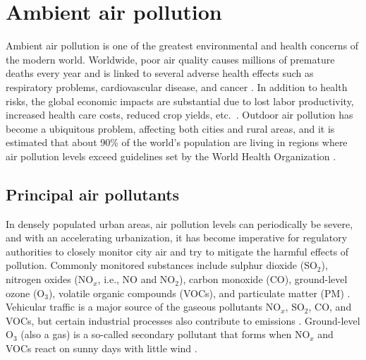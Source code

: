 \section{Ambient air pollution}

Ambient air pollution is one of the greatest environmental and health concerns of the modern world. Worldwide, poor air quality causes millions of premature deaths every year and is linked to several adverse health effects such as respiratory problems, cardiovascular disease, and cancer \cite{who2016}. In addition to health risks, the global economic impacts are substantial due to lost labor productivity, increased health care costs, reduced crop yields, etc.\ \cite{oecd2016}. Outdoor air pollution has become a ubiquitous problem, affecting both cities and rural areas, and it is estimated that about 90\% of the world's population are living in regions where air pollution levels exceed guidelines set by the World Health Organization \cite{who2016}. 

\subsection{Principal air pollutants}
\label{sec:airpollutants}
In densely populated urban areas, air pollution levels can periodically be severe, and with an accelerating urbanization, it has become imperative for regulatory authorities to closely monitor city air and try to mitigate the harmful effects of pollution. Commonly monitored substances include sulphur dioxide (SO$_2$), nitrogen oxides (NO$_x$, i.e., NO and NO$_2$), carbon monoxide (CO), ground-level ozone (O$_3$), volatile organic compounds (VOCs), and particulate matter (PM) \cite{VanLoon2010}. Vehicular traffic is a major source of the gaseous pollutants NO$_x$, SO$_2$, CO, and VOCs, but certain industrial processes also contribute to emissions \cite{VanLoon2010}. Ground-level O$_3$ (also a gas) is a so-called secondary pollutant that forms when NO$_x$ and VOCs react on sunny days with little wind \cite{VanLoon2010}. 

